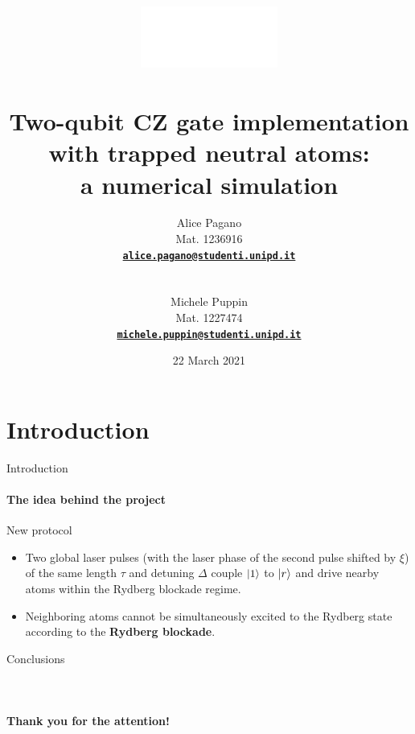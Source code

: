 \documentclass[8pt]{beamer}
\title[Two-qubit CZ gate with trapped neutral atoms]{
	\includegraphics[height=2cm]{images/logo/unipd_logo_white.png}\\
	~\\
	\textbf{ \Large
		Two-qubit CZ gate implementation with trapped neutral atoms: \\ a numerical simulation
	}
}
\institute{\large Quantum Information and Computing \\ a.y. 2020/21 }
\author[Alice Pagano - Michele Puppin]{\small%
    \parbox{2.5cm}{Alice Pagano}\parbox{2.5cm}{Mat. 1236916} \parbox{5.0cm}{\bf\href{mailto:alice.pagano@studenti.unipd.it}{\texttt{\color{linkcolor}alice.pagano@studenti.unipd.it}}} 
    \\ \vspace{0.3cm}
    \parbox{2.5cm}{Michele Puppin}\parbox{2.5cm}{Mat. 1227474} \parbox{5.0cm}{\bf\href{mailto:michele.puppin@studenti.unipd.it}{\texttt{\color{linkcolor}michele.puppin@studenti.unipd.it}}}}
\date{22 March 2021}
\begin{document}
	\begin{frame}[plain]
	    \titlepage
	\end{frame} 

    \setcounter{framenumber}{0}


	\section{Introduction}
	
	\begin{frame}[c]{Introduction}
	\framesubtitle{The idea behind the project}

	    \begin{block}{New protocol}
            \begin{itemize}
            \item Two global laser pulses (with the laser phase of the second pulse shifted by $\xi$) of the same length $\tau$ and detuning $\Delta$ couple $\ket{1}$ to $\ket{r}$ and drive nearby atoms within the Rydberg blockade regime.
            \item Neighboring atoms cannot be simultaneously excited to the Rydberg state according to the \textbf{Rydberg blockade}.
            \end{itemize}
        \end{block}
	\end{frame}


 	\begin{frame}{Conclusions}
	\framesubtitle{~}  

        \begin{center}
            \begin{minipage}[c]{0.55\textwidth}
                \begin{tcolorbox}[colframe=mydarkblue,colback=myblue,coltext=black]
                    \begin{center}
                        \Huge \textbf{Thank you for the attention!}
                    \end{center}
                \end{tcolorbox}
            \end{minipage}
        \end{center}
        
	\end{frame}	
	
	
	
 
\end{document}

